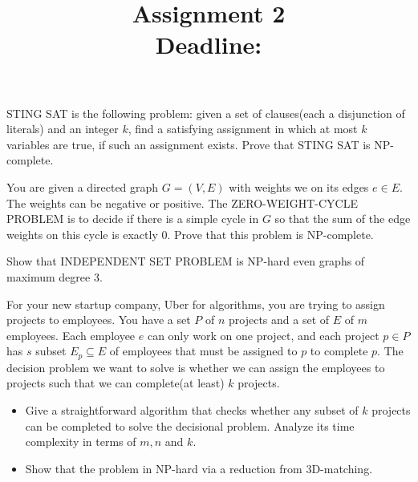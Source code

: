 \documentclass{article}
\title{{\bf Assignment 2} \\ {\large Deadline: }}
\author{}
\date{}
\newcounter{exercise}
\newcommand{\<}{
    \langle}
\renewcommand{\>}{
    \rangle}
\begin{document}
\maketitle


{\large





\begin{exercise}
\textsf{STING SAT} is the following problem: given a set of clauses(each a disjunction of literals) and an integer $k$, find a satisfying assignment in which at most 
$k$ variables are true, if such an assignment exists. Prove that \textsf{STING SAT} is NP-complete.
\end{exercise}

\begin{exercise}
You are given a directed graph $G=(V,E)$ with weights we on its edges $e\in E$. The weights can be negative or positive. The \textsf{ZERO-WEIGHT-CYCLE PROBLEM} is to decide if there is a simple cycle in $G$ so that the sum of the edge weights on this cycle is exactly $0$. Prove that this problem is NP-complete.
\end{exercise}

\begin{exercise}
Show that \textsf{INDEPENDENT SET PROBLEM} is NP-hard even graphs of maximum degree $3$.
\end{exercise}

\begin{exercise}
For your new startup company, Uber for algorithms, you are trying to assign projects to employees. You have a set $P$ of $n$ projects and a set of $E$ of $m$ employees. Each employee $e$ can only work on one project, and each project $p\in P$ has $s$ subset $E_p\subseteq E$ of employees that must be assigned to $p$ to complete $p$. The decision problem we want to solve is whether we can assign the employees to projects such that we can complete(at least) $k$ projects.
\begin{itemize}
\item Give a straightforward algorithm that checks whether any subset of $k$ projects can be completed to solve the decisional problem. Analyze its time complexity in terms of $m,n$ and $k$.
\item Show that the problem in NP-hard via a reduction from 3D-matching.
\end{itemize}
\end{exercise}

}
\end{document}
